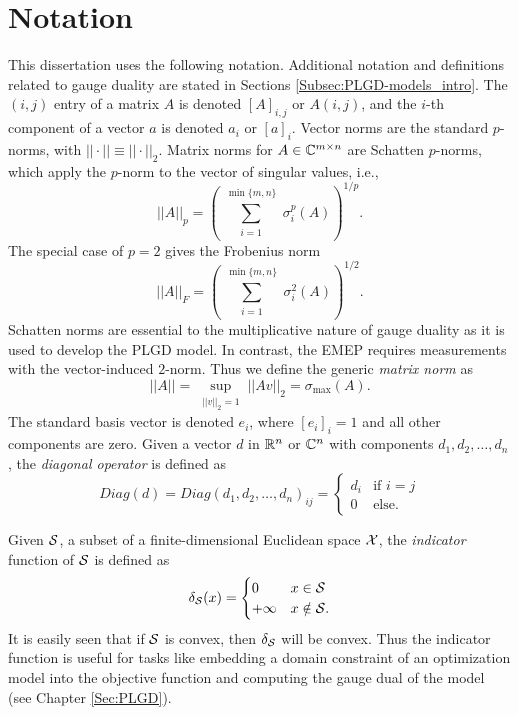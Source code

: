 \section{Notation} 		\label{Subsec:intro-notation}


This dissertation uses the following notation.  Additional notation and definitions related to gauge duality are stated in Sections \ref{Subsec:PLGD-models_intro}.  The $(i,j)$ entry of a matrix $A$ is denoted $[A]_{i,j}$ or $A(i,j)$, and the $i$-th component of a vector $a$ is denoted $a_i$ or $[a]_i$.  Vector norms are the standard $p$-norms, with $||\cdot|| \equiv || \cdot ||_2$.   Matrix norms for $A \in {\mathbb C}^{m \times n}$ are Schatten $p$-norms, which apply the  $p$-norm to the vector of singular values, i.e.,
\begin{equation}  \label{Def:shatten_norms}
||A||_p  = \left( \sum_{\substack{i = 1}}^{\substack{\min\{m, n \}}} \sigma_i^p(A) \right)^{1/p}.
\end{equation}
The special case of $p = 2$ gives the Frobenius norm
\begin{equation} 	\label{Def:Frobenius_norm}
||A||_F = \left(   \sum_{\substack{i = 1}}^{\substack{\min\{m, n \}}} \sigma_i^2(A)  \right)^{1/2}.
\end{equation}
Schatten norms are essential to the multiplicative nature of gauge duality as it is used to develop the PLGD model.  In contrast, the EMEP requires measurements with the vector-induced $2$-norm.  Thus we define the generic \textit{matrix norm} as
\begin{equation} 		\label{Def:matrix_norm}
||A|| = \sup_{\substack{||v||_2 = 1}} ||Av||_2 = \sigma_{\max}(A).
\end{equation}
The standard basis vector is denoted $e_i$, where $[e_i]_i = 1$ and all other components are zero.  
Given a vector $d$ in ${\mathbb R}^n$ or ${\mathbb C}^n$ with components $d_1, d_2, \ldots, d_n$, the \textit{diagonal operator} is defined as
\begin{equation}
Diag(d) = Diag(d_1, d_2, \ldots, d_n)_{ij} = 
	\begin{cases}
		d_i 		&		\text{if } i = j	\\
		0		&	\text{else}.
	\end{cases}
\end{equation}

Given ${\mathcal S}$, a subset of a finite-dimensional Euclidean space ${\mathcal X}$, the \textit{indicator} function of ${\mathcal S}$ is defined as
\begin{equation}  			\label{Def:indicator_function}
\delta_{\mathcal S}(x) =
	\begin{cases}
		0		&	x \in {\mathcal S}		\\
		+\infty		&	x \notin {\mathcal S}.
	\end{cases}
\end{equation}
It is easily seen that if ${\mathcal S}$ is convex, then $\delta_{\mathcal S}$ will be convex.  Thus the indicator function is useful for tasks like embedding a domain constraint of an optimization model into the objective function and computing the gauge dual of the model (see Chapter \ref{Sec:PLGD}).


